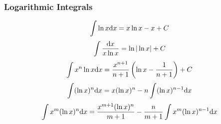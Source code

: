 \subsubsection*{Logarithmic Integrals}
\[ 
\int \ln x \mathrm{d} x = x \ln x - x + C
\]
\[ 
\int \frac{\mathrm{d} x}{x \ln x} =\ln |\ln x|+C 
\]
\[ 
\int x^n \ln x \mathrm{d} x = \frac{x^{n+1}}{n+1}\left(\ln x - \frac{1}{n+1} \right) +C 
\]
\[ 
\int (\ln x)^{n} \mathrm{d} x = x(\ln x)^n - n \int (\ln x)^{n-1} \mathrm{d} x 
\]
\[ 
\int x^m(\ln x)^n \mathrm{d} x=\frac{x^{m+1}(\ln x)^n}{m+1} - \frac{n}{m+1} \int x^m(\ln x)^{n-1}\mathrm{d} x 
\]
